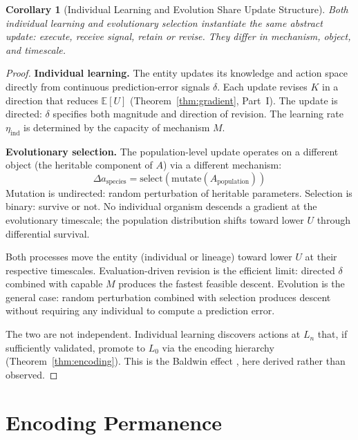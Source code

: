 \documentclass[11pt]{article}
\newtheorem{corollary}[theorem]{Corollary}
\theoremstyle{definition}
\begin{document}
\begin{corollary}[Individual Learning and Evolution Share Update Structure]
\label{cor:multiscale}
Both individual learning and evolutionary selection instantiate the
same abstract update: execute, receive signal, retain or revise. They
differ in mechanism, object, and timescale.
\end{corollary}

\begin{proof}
\textbf{Individual learning.} The entity updates its knowledge and
action space directly from continuous prediction-error signals
$\delta$. Each update revises $K$ in a direction that reduces
$\mathbb{E}[U]$ (Theorem~\ref{thm:gradient}, Part~I). The update is
directed: $\delta$ specifies both magnitude and direction of revision.
The learning rate $\eta_{\mathrm{ind}}$ is determined by the capacity
of mechanism $M$.

\textbf{Evolutionary selection.} The population-level update operates
on a different object (the heritable component of $A$) via a different
mechanism:
\[
\Delta a_{\mathrm{species}} = \mathrm{select}(\mathrm{mutate}(A_{\mathrm{population}}))
\]
Mutation is undirected: random perturbation of heritable parameters.
Selection is binary: survive or not. No individual organism descends a
gradient at the evolutionary timescale; the population distribution
shifts toward lower $U$ through differential survival.

Both processes move the entity (individual or lineage) toward lower
$U$ at their respective timescales. Evaluation-driven revision is the
efficient limit: directed $\delta$ combined with capable $M$ produces
the fastest feasible descent. Evolution is the general case: random
perturbation combined with selection produces descent without requiring
any individual to compute a prediction error.

The two are not independent. Individual learning discovers actions at
$L_n$ that, if sufficiently validated, promote to $L_0$ via the
encoding hierarchy (Theorem~\ref{thm:encoding}). This is the Baldwin
effect \cite{Hinton1987}, here derived rather than observed.
\end{proof}

\section{Encoding Permanence}
\label{sec:encoding}
\end{document}
